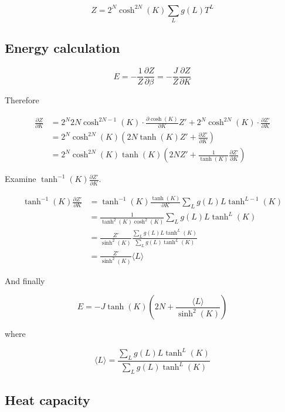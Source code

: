 \begin{equation}
    Z = 2^N \cosh^{2N} (K) \sum_L g(L) T^L
\end{equation}

\subsection{Energy calculation}

\begin{equation}
    E = - \frac{1}{Z} \frac{\partial Z}{\partial \beta} = - \frac{J}{Z} \frac{\partial Z}{\partial K}
\end{equation}

Therefore

\begin{align*}
    \frac{\partial Z}{\partial K} &= 2^N 2N \cosh^{2N-1}(K) \cdot \frac{\partial \cosh(K)}{\partial K} Z' + 2^N \cosh^{2N}(K) \cdot \frac{\partial Z'}{\partial K} \\
    &= 2^N \cosh^{2N}(K) \left ( 2N \tanh(K) Z' + \frac{\partial Z'}{\partial K} \right ) \\
    &= 2^N \cosh^{2N}(K) \tanh(K) \left ( 2N Z' + \frac{1}{\tanh(K)}\frac{\partial Z'}{\partial K} \right )
\end{align*}

Examine $\tanh^{-1}(K) \frac{\partial Z'}{\partial K}$.

\begin{align*}
    \tanh^{-1}(K) \frac{\partial Z'}{\partial K} &= \tanh^{-1}(K) \frac{\tanh(K)}{\partial K} \sum_L g(L) L \tanh^{L-1}(K) \\
    &= \frac{1}{\tanh^2(K)\cosh^2(K)} \sum_L g(L) L \tanh^L(K) \\
    &= \frac{Z'}{\sinh^2(K)} \frac{\sum_L g(L) L \tanh^L(K)}{\sum_L g(L) \tanh^L(K)} \\
    &= \frac{Z'}{\sinh^2(K)} \langle L \rangle
\end{align*}

And finally

\begin{equation}
    E = -J \tanh(K) \left ( 2N + \frac{\langle L \rangle}{\sinh^2(K)} \right )
\end{equation}

where

\begin{equation}
    \langle L \rangle = \frac{\sum_L g(L) L \tanh^L(K)}{\sum_L g(L) \tanh^L(K)}
\end{equation}


\subsection{Heat capacity}

